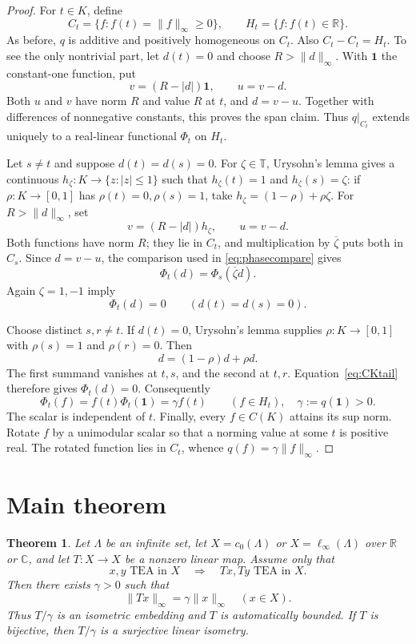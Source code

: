 \documentclass[11pt]{article}
\newtheorem{theorem}{Theorem}
\newcommand{\Torus}{\mathbb T}
\begin{document}
\begin{proof}
For $t\in K$, define
\[
 C_t=\{f:f(t)=\|f\|_\infty\ge0\},\qquad
 H_t=\{f:f(t)\in\mathbb R\}.
\]
As before, $q$ is additive and positively homogeneous on $C_t$.  Also
$C_t-C_t=H_t$.  To see the only nontrivial part, let $d(t)=0$ and choose
$R>\|d\|_\infty$.  With $\mathbf1$ the constant-one function, put
\[
 v=(R-|d|)\mathbf1,\qquad u=v-d.
\]
Both $u$ and $v$ have norm $R$ and value $R$ at $t$, and $d=v-u$.
Together with differences of nonnegative constants, this proves the span
claim.  Thus $q|_{C_t}$ extends uniquely to a real-linear functional
$\Phi_t$ on $H_t$.

Let $s\ne t$ and suppose $d(t)=d(s)=0$.  For
$\zeta\in\Torus$, Urysohn's lemma gives a continuous
$h_\zeta:K\to\{z:|z|\le1\}$ such that
$h_\zeta(t)=1$ and $h_\zeta(s)=\zeta$: if
$\rho:K\to[0,1]$ has $\rho(t)=0,\rho(s)=1$, take
$h_\zeta=(1-\rho)+\rho\zeta$.
For $R>\|d\|_\infty$, set
\[
 v=(R-|d|)h_\zeta,\qquad u=v-d.
\]
Both functions have norm $R$; they lie in $C_t$, and multiplication by
$\overline\zeta$ puts both in $C_s$.  Since $d=v-u$, the comparison used in
\eqref{eq:phasecompare} gives
\[
 \Phi_t(d)=\Phi_s(\overline\zeta d).
\]
Again $\zeta=1,-1$ imply
\begin{equation}\label{eq:CKtail}
 \Phi_t(d)=0\qquad(d(t)=d(s)=0).
\end{equation}

Choose distinct $s,r\ne t$.  If $d(t)=0$, Urysohn's lemma supplies
$\rho:K\to[0,1]$ with $\rho(s)=1$ and $\rho(r)=0$.  Then
\[
 d=(1-\rho)d+\rho d.
\]
The first summand vanishes at $t,s$, and the second at $t,r$.
Equation~\eqref{eq:CKtail} therefore gives $\Phi_t(d)=0$.  Consequently
\[
 \Phi_t(f)=f(t)\Phi_t(\mathbf1)=\gamma f(t)\qquad(f\in H_t),
 \quad \gamma:=q(\mathbf1)>0.
\]
The scalar is independent of $t$.  Finally, every $f\in C(K)$ attains its
sup norm.  Rotate $f$ by a unimodular scalar so that a norming value at some
$t$ is positive real.  The rotated function lies in $C_t$, whence
$q(f)=\gamma\|f\|_\infty$.
\end{proof}

\section{Main theorem}

\begin{theorem}\label{thm:main}
Let $\Lambda$ be an infinite set, let
$X=c_0(\Lambda)$ or $X=\ell_\infty(\Lambda)$ over $\mathbb R$ or
$\mathbb C$, and let $T:X\to X$ be a nonzero linear map.  Assume only that
\[
 x,y\text{ TEA in }X\quad\Longrightarrow\quad Tx,Ty\text{ TEA in }X.
\]
Then there exists $\gamma>0$ such that
\[
 \boxed{\ \|Tx\|_\infty=\gamma\|x\|_\infty\quad(x\in X).\ }
\]
Thus $T/\gamma$ is an isometric embedding and $T$ is automatically bounded.
If $T$ is bijective, then $T/\gamma$ is a surjective linear isometry.
\end{theorem}
\end{document}
